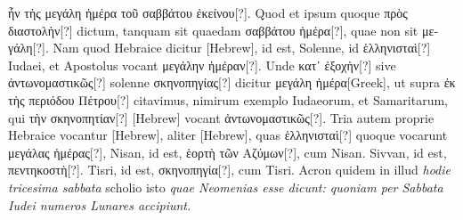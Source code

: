 \textgreek{ἦν τὴς μεγάλη ἡμέρα τοῦ σαββάτου ἐκείνου[?]}.
Quod
et ipsum quoque \textgreek{πρὸς διαστολὴν[?]} dictum, tanquam sit quaedam
 \textgreek{σαββάτου ἡμέρα[?]},
quae non sit \textgreek{μεγάλη[?]}.
Nam quod Hebraice dicitur \texthebrew{[Hebrew]},
id est, Solenne, id \textgreek{ἑλληνισταὶ[?]} Iudaei, et Apostolus vocant
 \textgreek{μεγάλην
ἡμέραν[?]}.
Unde \textgreek{κατ᾽ ἐξοχὴν[?]} sive
 \textgreek{ἀντωνομαστικῶς[?]} solenne
 \textgreek{σκηνοπηγίας[?]}
dicitur \textgreek{μεγάλη ἡμέρα[Greek]},
 ut supra \textgreek{ἐκ τὴς περιόδου Πέτρου[?]} citavimus, nimirum
exemplo Iudaeorum, et Samaritarum, qui \textgreek{τὴν σκηνοπητίαν[?]}
\texthebrew{[Hebrew]} vocant \textgreek{ἀντωνομαστικῶς[?]}.
Tria autem proprie Hebraice vocantur \texthebrew{[Hebrew]},
aliter \texthebrew{[Hebrew]}, quas \textgreek{ἑλληνισταὶ[?]} quoque vocarunt
 \textgreek{μεγάλας
ἡμέρας[?]},  Nisan, id est, \textgreek{ἑορτὴ τῶν Αζύμων[?]},
 cum  Nisan.
 Sivvan,
id est, \textgreek{πεντηκοστὴ[?]}.
 Tisri, id est, \textgreek{σκηνοπηγία[?]}, cum
  Tisri.
Acron quidem in illud \textit{\emd{} hodie tricesima sabbata}
 scholio isto
\textit{quae Neomenias esse dicunt: quoniam per Sabbata Iudei numeros Lunares
accipiunt.}

